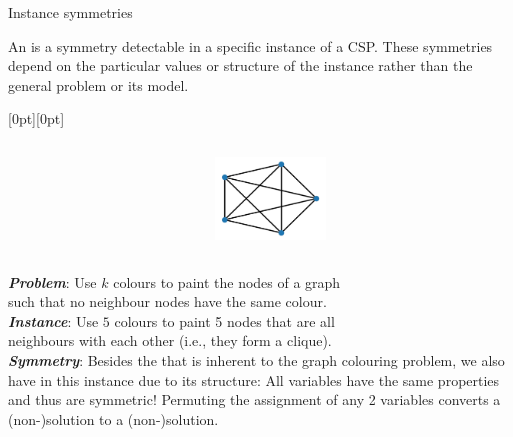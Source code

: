 \documentclass{cons-beamer}
\begin{document}
\begin{frame}{Instance symmetries}
  \begin{definition}
    An  is a symmetry detectable in a specific instance of a CSP. These symmetries depend on the particular values or structure of the instance rather than the general problem or its model.
  \end{definition}
  \vfill

  \begin{example}
    \small
    \raisebox{-\height}[0pt][0pt]{%
      \begin{columns}
        \begin{column}{0.65\textwidth}
            
        \end{column}
        \begin{column}{0.3\textwidth}
          \includegraphics[height=22mm]{images/graph_clique.png}%
        \end{column}
      \end{columns}
    }

    \textit{\textbf{Problem}}: Use $k$ colours to paint the nodes of a graph \\such that no neighbour nodes have the same colour. \\[+5pt]
    \textit{\textbf{Instance}}: Use $5$ colours to paint 5 nodes that are all \\neighbours with each other (i.e., they form a clique). \\[+5pt]
    
    \textit{\textbf{Symmetry}}: Besides the  that is inherent to the graph colouring problem, we also have  in this instance due to its structure: All variables have the same properties and thus are symmetric! Permuting the assignment of any 2 variables converts a (non-)solution to a (non-)solution.    
  \end{example}
\end{frame}
\end{document}
